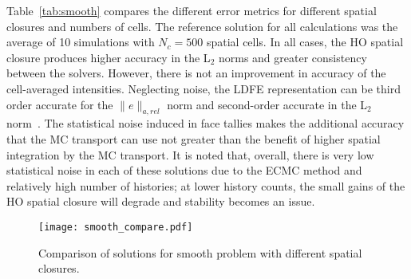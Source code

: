 Table~\ref{tab:smooth} compares the different error metrics for different spatial
closures and numbers of cells.  The reference solution for all calculations was the average of 10 simulations with $N_c=500$ spatial
cells.  In all cases, the HO spatial closure produces higher accuracy in the L$_2$
norms and greater consistency between the solvers.  However, there is not an
improvement in accuracy of the cell-averaged intensities.  Neglecting noise, the LDFE representation can be third order
accurate for the $\|e\|_{a,rel}$ norm and second-order accurate in the L$_2$ norm~\cite{morel_ldtrt}. 
The statistical noise induced in face tallies makes the
additional accuracy that the MC transport can use not greater than the benefit of
higher spatial integration by the MC transport.  It
is noted that, overall, there is very low statistical noise in each of these
solutions due to the ECMC method and relatively high number of histories; at lower
history counts, the small gains of the HO spatial closure will degrade and stability
becomes an issue.

\begin{figure}[H]
    \centering
    \texttt{[image: smooth\_compare.pdf]}
    \caption{\label{fig:smooth_compare} Comparison of solutions for smooth problem with different spatial closures.}
\end{figure}

